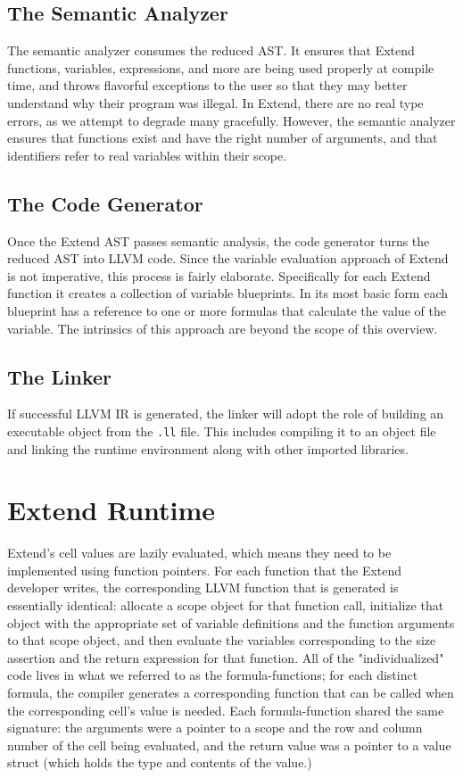   \subsection{The Semantic Analyzer}
  The semantic analyzer consumes the reduced AST. It ensures that Extend functions, variables, expressions, and more are being used properly at compile time, and throws flavorful exceptions to the user so that they may better understand why their program was illegal. In Extend, there are no real type errors, as we attempt to degrade many gracefully. However, the semantic analyzer ensures that functions exist and have the right number of arguments, and that identifiers refer to real variables within their scope.

  \subsection{The Code Generator}
 Once the Extend AST passes semantic analysis, the code generator turns the reduced AST into LLVM code. Since the variable evaluation approach of Extend is not imperative, this process is fairly elaborate. Specifically for each Extend function it creates a collection of variable blueprints. In its most basic form each blueprint has a reference to one or more formulas that calculate the value of the variable. The intrinsics of this approach are beyond the scope of this overview.

  \subsection{The Linker}
  If successful LLVM IR is generated, the linker will adopt the role of building an executable object from the \texttt{.ll} file. This includes compiling it to an object file and linking the runtime environment along with other imported libraries.

  \section{Extend Runtime}
  Extend's cell values are lazily evaluated, which means they need to be implemented using function pointers. For each function that the Extend developer writes, the corresponding LLVM function that is generated is essentially identical: allocate a scope object for that function call, initialize that object with the appropriate set of variable definitions and the function arguments to that scope object, and then evaluate the variables corresponding to the size assertion and the return expression for that function. All of the "individualized" code lives in what we referred to as the formula-functions; for each distinct formula, the compiler generates a corresponding function that can be called when the corresponding cell's value is needed. Each formula-function shared the same signature: the arguments were a pointer to a scope and the row and column number of the cell being evaluated, and the return value was a pointer to a value struct (which holds the type and contents of the value.)


